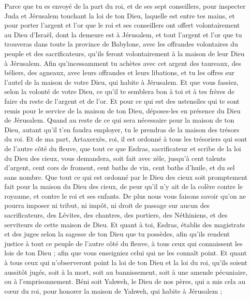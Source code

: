 \begin{multicols}{2}
Parce que tu es envoyé de la part du roi, et de ses sept conseillers, pour inspecter Juda et Jérusalem touchant la loi de ton Dieu, laquelle est entre tes mains,
et pour porter l'argent et l'or que le roi et ses conseillers ont offert volontairement au Dieu d'Israël, dont la demeure est à Jérusalem,
et tout l'argent et l'or que tu trouveras dans toute la province de Babylone, avec les offrandes volontaires du peuple et des sacrificateurs, qu'ils feront volontairement à la maison de leur Dieu à Jérusalem.
Afin qu’incessamment tu achètes avec cet argent des taureaux, des béliers, des agneaux, avec leurs offrandes et leurs libations, et tu les offres sur l'autel de la maison de votre Dieu, qui habite à Jérusalem.
Et que vous fassiez, selon la volonté de votre Dieu, ce qu'il te semblera bon à toi et à tes frères de faire du reste de l'argent et de l'or.
Et pour ce qui est des ustensiles qui te sont remis pour le service de la maison de ton Dieu, déposes-les en présence du Dieu de Jérusalem.
Quand au reste de ce qui sera nécessaire pour la maison de ton Dieu, autant qu'il t'en faudra employer, tu le prendras de la maison des trésors du roi.
Et de ma part, Artaxerxès, roi, il est ordonné à tous les trésoriers qui sont de l'autre côté du fleuve, que tout ce que Esdras, sacrificateur et scribe de la loi du Dieu des cieux, vous demandera, soit fait avec zèle,
jusqu'à cent talents d'argent, cent cors de froment, cent baths de vin, cent baths d'huile, et du sel sans nombre.
Que tout ce qui est ordonné par le Dieu des cieux soit promptement fait pour la maison du Dieu des cieux, de peur qu'il n'y ait de la colère contre le royaume, et contre le roi et ses enfants.
De plus nous vous faisons savoir qu'on ne pourra imposer ni tribut, ni impôt, ni droit de passage sur aucun des sacrificateurs, des Lévites, des chantres, des portiers, des  Néthiniens, et des serviteurs de cette maison de Dieu.
Et quant à toi, Esdras, établis des magistrats et des juges selon la sagesse de ton Dieu que tu possèdes, afin qu'ils rendent justice à tout ce peuple de l'autre côté du fleuve, à tous ceux qui connaissent les lois de ton Dieu ; afin que vous enseigniez celui qui ne les connaît point.
Et quant à tous ceux qui n'observeront point la loi de ton Dieu et la loi du roi, qu’ils soient aussitôt jugés, soit à la mort, soit au bannissement, soit à une amende pécuniaire, ou à l’emprisonnement.
Béni soit Yahweh, le Dieu de nos pères, qui a mis cela au cœur du roi, pour honorer la maison de Yahweh, qui habite à Jérusalem ;

\end{multicols}
